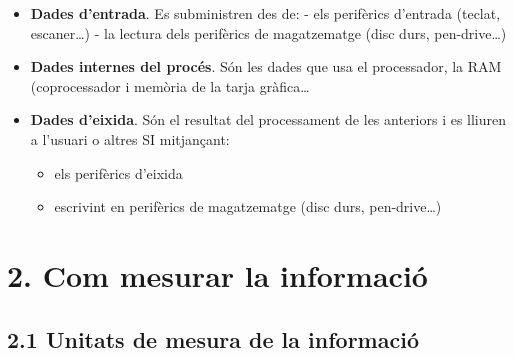 \documentclass[
  12 pt,
  a4paper,
]{article}
\providecommand{\tightlist}{%
  \setlength{\itemsep}{0pt}\setlength{\parskip}{0pt}}
\begin{document}
\begin{itemize}
\tightlist
\item
  \textbf{Dades d'entrada}. Es subministren des de: - els perifèrics
  d'entrada (teclat, escaner\ldots) - la lectura dels perifèrics de
  magatzematge (disc durs, pen-drive\ldots)
\item
  \textbf{Dades internes del procés}. Són les dades que usa el
  processador, la RAM (coprocessador i memòria de la tarja
  gràfica\ldots{}
\item
  \textbf{Dades d'eixida}. Són el resultat del processament de les
  anteriors i es lliuren a l'usuari o altres SI mitjançant:

  \begin{itemize}
  \tightlist
  \item
    els perifèrics d'eixida
  \item
    escrivint en perifèrics de magatzematge (disc durs, pen-drive\ldots)
  \end{itemize}
\end{itemize}

\section{2. Com mesurar la
informació}\label{com-mesurar-la-informaciuxf3}

\subsection{2.1 Unitats de mesura de la
informació}\label{unitats-de-mesura-de-la-informaciuxf3}
\end{document}
